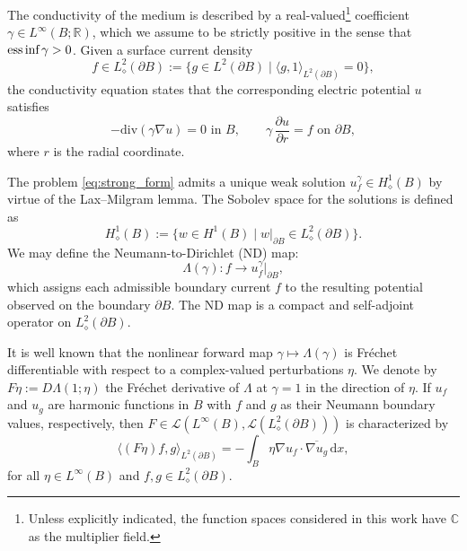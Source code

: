 \documentclass[reqno]{amsart}
\numberwithin{equation}{section}
\numberwithin{figure}{section}
\numberwithin{table}{section}
\theoremstyle{plain}
\theoremstyle{definition}
\theoremstyle{remark}
\newcommand{\inner}[1]{\langle#1\rangle}
\newcommand{\essinf}{\mathop{\textup{ess\,inf}}}
\newcommand{\di}{\mathrm{d}}   %
\newcommand{\R}{\mathbb{R}}
\newcommand{\C}{\mathbb{C}}
\newcommand{\sphe}{{\partial B}}
\begin{document}
The conductivity of the medium is described by a real-valued\footnote{Unless explicitly indicated, the function spaces considered in this work have \( \C \) as the multiplier field.} coefficient \( \gamma \in L^\infty(B; \R) \), which we assume to be strictly positive in the sense that \( \essinf \gamma > 0 \).
%
Given a surface current density
%
\begin{equation*}
    f \in L^2_\diamond(\sphe) := \{ g\in L^2(\sphe) \mid \inner{g,1}_{L^2(\sphe)} = 0 \},
\end{equation*}
%
the conductivity equation states that the corresponding electric potential \( u \) satisfies
%
\begin{equation} \label{eq:strong_form}
    -\mathrm{div}(\gamma\nabla u) = 0 \text{ in } B, \qquad \gamma \,\frac{\partial u}{\partial r} = f \text{ on } \sphe,
\end{equation}
%
where \( r \) is the radial coordinate.
%


The problem \eqref{eq:strong_form} admits a unique weak solution \( u^\gamma_f \in H^1_\diamond(B) \) by virtue of the Lax–Milgram lemma. 
%
The Sobolev space for the solutions is defined as
%
\begin{equation*}
    H_\diamond^1(B) := \{w\in H^1(B) \mid w|_{\sphe} \in L^2_\diamond(\sphe)\}.
\end{equation*}
%
We may define the Neumann-to-Dirichlet (ND) map:
%
\[ \Lambda(\gamma) : f \to u^\gamma_f |_{\sphe}, \]
%
which assigns each admissible boundary current \( f \) to the resulting potential observed on the boundary \( \sphe \). 
%
The ND map is a compact and self-adjoint operator on \(  L^2_\diamond(\sphe) \).
%


It is well known that the nonlinear forward map \( \gamma\mapsto\Lambda(\gamma) \) is Fr\'echet differentiable with respect to a complex-valued perturbations \( \eta \). 
%
We denote by \( F \eta := D \Lambda(1; \eta) \) the Fr\'echet derivative of \( \Lambda \) at \( \gamma = 1 \) in the direction of \( \eta \). 
%
If \( u_f \) and \( u_g \) are harmonic functions in \( B \) with \( f \) and \( g \) as their Neumann boundary values, respectively, then \( F\in \mathscr{L}(L^\infty(B),\mathscr{L}(L^2_\diamond(\sphe))) \) is characterized by
%
\begin{equation} \label{eq:frechet_redef}
    \inner{(F \eta) f, g}_{L^2(\sphe)} = -\int_B \eta \nabla u_f \cdot \overline{\nabla u_g} \,\di x,
\end{equation}
%
for all \( \eta \in L^\infty(B) \) and \( f, g \in L^2_\diamond(\sphe) \).
%
\end{document}
